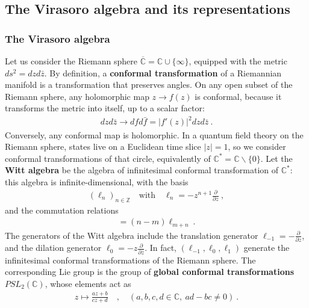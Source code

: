 \documentclass[12pt, a4paper]{article}
\newcommand{\myindex}[1]{\textbf{\boldmath #1}}
\theoremstyle{break}
\begin{document}
\subsection{The Virasoro algebra and its representations}\label{sec:vir}

\subsubsection{The Virasoro algebra}

Let us consider the Riemann sphere $\overline{\mathbb{C}}=\mathbb{C}\cup \{\infty\}$, equipped with the metric $ds^2 = dzd\bar z$. By definition, a \myindex{conformal transformation} of a Riemannian manifold is a transformation that preserves angles. On any open subset of the Riemann sphere, any holomorphic map $z\to f(z)$ is conformal, because it transforms the metric into itself, up to a scalar factor: 
\begin{align}
 dzd\bar z\to dfd\bar f = |f'(z)|^2 dzd\bar z\ .
\end{align}
Conversely, any conformal map is holomorphic. 
In a quantum field theory on the Riemann sphere, states live on a Euclidean time slice $|z|=1$, so we consider conformal transformations of that circle, equivalently of $\mathbb{C}^*= \mathbb{C}\backslash \{0\}$.
Let the \myindex{Witt algebra} be the algebra of infinitesimal conformal transformation of $\mathbb{C}^*$: this algebra is infinite-dimensional, with the basis 
\begin{align}
 \left(\ell_n\right)_{n\in\mathbb{Z}}  \quad \text{with} \quad \ell_n = -z^{n+1}\frac{\partial}{\partial z}\ ,
 \label{lpz}
\end{align}
and the commutation relations 
\begin{align}
 [\ell_n,\ell_m] = (n-m)\ell_{m+n}\ .
\end{align}
The generators of the Witt algebra include the translation generator $\ell_{-1} = -\frac{\partial}{\partial z}$, and the dilation generator $\ell_0 = -z\frac{\partial}{\partial z}$. In fact, $(\ell_{-1},\ell_0,\ell_1)$ generate the infinitesimal conformal transformations of the Riemann sphere.
The corresponding Lie group is the group of \myindex{global conformal transformations} $PSL_2(\mathbb{C})$, whose elements act as 
\begin{align}
 z \mapsto \frac{az+b}{cz+d}\quad , \quad (a,b,c,d\in \mathbb{C},\ ad-bc\neq 0)\ .
 \label{abcd}
\end{align}
\end{document}
